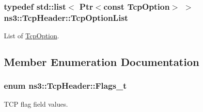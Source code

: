 \subsubsection[{\texorpdfstring{Tcp\+Option\+List}{TcpOptionList}}]{\setlength{\rightskip}{0pt plus 5cm}typedef {\bf std\+::list}$<$ {\bf Ptr}$<$const {\bf Tcp\+Option}$>$ $>$ {\bf ns3\+::\+Tcp\+Header\+::\+Tcp\+Option\+List}}\hypertarget{classns3_1_1TcpHeader_ac28e919e2a5be37ada2b8f06cb0c4d4a}{}\label{classns3_1_1TcpHeader_ac28e919e2a5be37ada2b8f06cb0c4d4a}


List of \hyperlink{classns3_1_1TcpOption}{Tcp\+Option}. 



\subsection{Member Enumeration Documentation}
\subsubsection[{\texorpdfstring{Flags\+\_\+t}{Flags_t}}]{\setlength{\rightskip}{0pt plus 5cm}enum {\bf ns3\+::\+Tcp\+Header\+::\+Flags\+\_\+t}}\hypertarget{classns3_1_1TcpHeader_a5f3d432941327854b5ad621e467479c6}{}\label{classns3_1_1TcpHeader_a5f3d432941327854b5ad621e467479c6}


T\+CP flag field values. 

